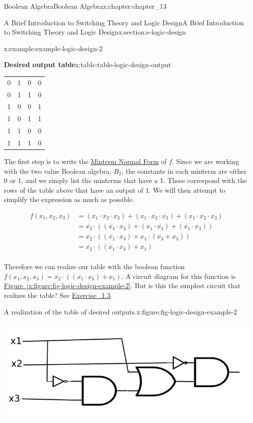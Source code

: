 \documentclass[oneside,10pt,]{book}
\newcommand{\xreffont}{\relax}
\numberwithin{equation}{section}
\begin{document}
\begin{chapterptx}{Boolean Algebra}{}{Boolean Algebra}{}{}{x:chapter:chapter_13}
\begin{sectionptx}{A Brief Introduction to Switching Theory and Logic Design}{}{A Brief Introduction to Switching Theory and Logic Design}{}{}{x:section:s-logic-design}
\begin{example}{}{x:example:example-logic-design-2}
\begin{tableptx}{\textbf{Desired output table}}{x:table:table-logic-design-output}{}
{\begin{tabular}{cccc}
0&1&0&0\tabularnewline[0pt]
0&1&1&0\tabularnewline[0pt]
1&0&0&1\tabularnewline[0pt]
1&0&1&1\tabularnewline[0pt]
1&1&0&0\tabularnewline[0pt]
1&1&1&0
\end{tabular}
}%
\end{tableptx}%
The first step is to write the \hyperref[x:definition:def-minterm-normal-form]{Minterm Normal Form} of \(f\).  Since we are working with the two value Boolean algebra, \(B_2\), the constants in each minterm are either 0 or 1, and we simply list the minterms that have a 1. These correspond with the rows of the table above that have an output of 1.  We will then attempt to simplify the expression as much as possible.%
\par
%
\begin{equation*}
\begin{split}
f\left(x_1, x_2, x_3\right)&= (\overline{x_1} \cdot  \overline{x_2} \cdot  x_3) + (x_1 \cdot  \overline{x_2} \cdot   \overline{x_3})+(x_1  \cdot   \overline{x_2} \cdot x_3)\\
&= \overline{x_2} \cdot( (\overline{x_1} \cdot   x_3) + (x_1 \cdot \overline{x_3})+(x_1 \cdot x_3))\\
&= \overline{x_2} \cdot( (\overline{x_1} \cdot   x_3) + x_1 \cdot (\overline{x_3}+ x_3))\\
&= \overline{x_2} \cdot ((\overline{x_1} \cdot   x_3) + x_1)\\
\end{split}
\end{equation*}
%
\par
Therefore we can realize our table with the boolean function \(f\left(x_1, x_2, x_3\right)=\overline{x_2} \cdot ((\overline{x_1} \cdot   x_3) + x_1)\). A circuit  diagram for this function is \hyperref[x:figure:fig-logic-design-example-2]{Figure~{\xreffont\ref{x:figure:fig-logic-design-example-2}}}.  But is this the simplest circuit that realizes the table?  See \hyperlink{x:exercise:exerc-simpler-circuit}{Exercise~{\xreffont 13.7.1.3}}.%
\begin{figureptx}{A realization of the table of desired outputs.}{x:figure:fig-logic-design-example-2}{}%
\begin{image}{0.2}{0.6}{0.2}%
\includegraphics[width=\linewidth]{images/fig-logic-design-example-2.png}

\end{image}
\end{figureptx}
\end{example}
\end{sectionptx}
\end{chapterptx}
\end{document}
